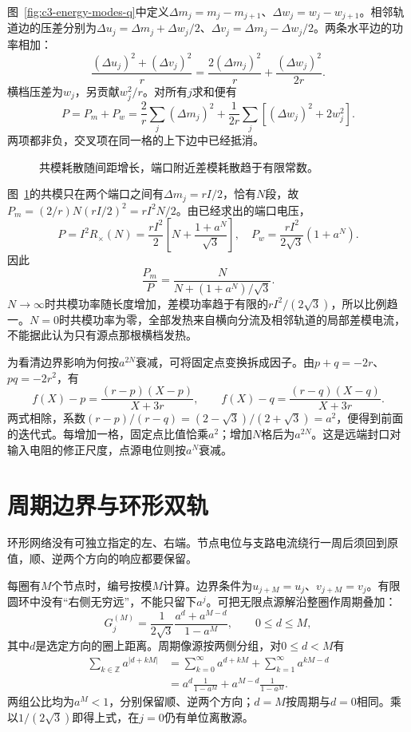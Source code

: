 \begin{solution}
图~\ref{fig:c3-energy-modes-q}中定义$\Delta m_j=m_j-m_{j+1}$、$\Delta w_j=w_j-w_{j+1}$。相邻轨道边的压差分别为$\Delta u_j=\Delta m_j+\Delta w_j/2$、$\Delta v_j=\Delta m_j-\Delta w_j/2$。两条水平边的功率相加：
\[
 \frac{(\Delta u_j)^2+(\Delta v_j)^2}r
 =\frac{2(\Delta m_j)^2}r+\frac{(\Delta w_j)^2}{2r}.
\]
横档压差为$w_j$，另贡献$w_j^2/r$。对所有$j$求和便有
\[
 P=P_m+P_w=\frac2r\sum_j(\Delta m_j)^2
 +\frac1{2r}\sum_j[(\Delta w_j)^2+2w_j^2].
\]
两项都非负，交叉项在同一格的上下边中已经抵消。
\begin{figure}[H]\centering
{}
\caption{共模耗散随间距增长，端口附近差模耗散趋于有限常数。}\label{fig:c3-energy-modes-s}
\end{figure}
图~\ref{fig:c3-energy-modes-s}的共模只在两个端口之间有$\Delta m_j=rI/2$，恰有$N$段，故$P_m=(2/r)N(rI/2)^2=rI^2N/2$。由已经求出的端口电压，
\[
 P=I^2R_\times(N)=\frac{rI^2}2\left[N+\frac{1+a^N}{\sqrt3}\right],\quad
 P_w=\frac{rI^2}{2\sqrt3}(1+a^N).
\]
因此
\[
 \boxed{\frac{P_m}P=\frac{N}{N+(1+a^N)/\sqrt3}}.
\]
$N\to\infty$时共模功率随长度增加，差模功率趋于有限的$rI^2/(2\sqrt3)$，所以比例趋一。$N=0$时共模功率为零，全部发热来自横向分流及相邻轨道的局部差模电流，不能据此认为只有源点那根横档发热。
\end{solution}




为看清边界影响为何按$a^{2N}$衰减，可将固定点变换拆成因子。由$p+q=-2r$、$pq=-2r^2$，有
\[
 f(X)-p=\frac{(r-p)(X-p)}{X+3r},\qquad
 f(X)-q=\frac{(r-q)(X-q)}{X+3r}.
\]
两式相除，系数$(r-p)/(r-q)=(2-\sqrt3)/(2+\sqrt3)=a^2$，便得到前面的迭代式。每增加一格，固定点比值恰乘$a^2$；增加$N$格后为$a^{2N}$。这是远端封口对输入电阻的修正尺度，点源电位则按$a^N$衰减。


\section{周期边界与环形双轨}
环形网络没有可独立指定的左、右端。节点电位与支路电流绕行一周后须回到原值，顺、逆两个方向的响应都要保留。

每圈有$M$个节点时，编号按模$M$计算。边界条件为$u_{j+M}=u_j$、$v_{j+M}=v_j$。有限圆环中没有“右侧无穷远”，不能只留下$a^j$。可把无限点源解沿整圈作周期叠加：
\[
 G_j^{(M)}=\frac1{2\sqrt3}
 \frac{a^d+a^{M-d}}{1-a^M},
 \qquad 0\le d\le M,
\]
其中$d$是选定方向的圈上距离。周期像源按两侧分组，对$0\le d<M$有
\[\begin{aligned}
\sum_{k\in\mathbb Z}a^{|d+kM|}
&=\sum_{k=0}^\infty a^{d+kM}+\sum_{k=1}^\infty a^{kM-d}\\
&=a^d\frac1{1-a^M}+a^{M-d}\frac1{1-a^M}.
\end{aligned}\]
两组公比均为$a^M<1$，分别保留顺、逆两个方向；$d=M$按周期与$d=0$相同。乘以$1/(2\sqrt3)$即得上式，在$j=0$仍有单位离散源。

